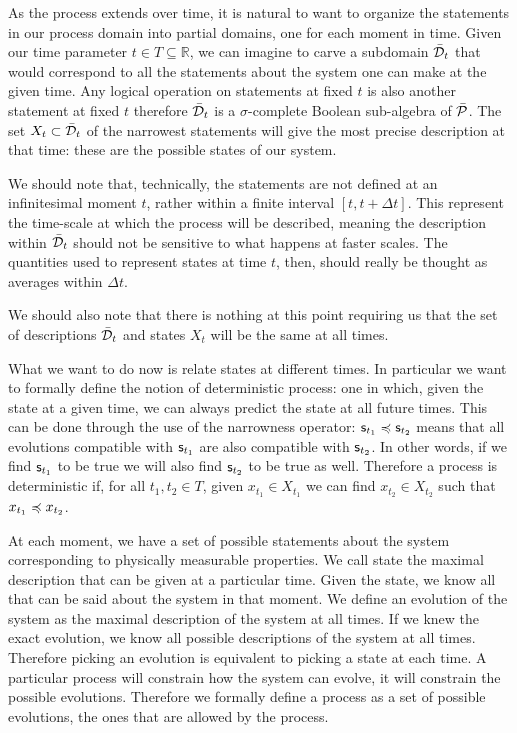 \documentclass[letterpaper]{article}
\begin{document}
As the process extends over time, it is natural to want to organize the statements in our process domain into partial domains, one for each moment in time. Given our time parameter $t \in T \subseteq \mathbb{R}$, we can imagine to carve a subdomain $\tdomain_t$ that would correspond to all the statements about the system one can make at the given time. Any logical operation on statements at fixed $t$ is also another statement at fixed $t$ therefore $\tdomain_t$ is a $\sigma$-complete Boolean sub-algebra of $\tdomain[P]$. The set $X_t \subset \tdomain_t$ of the narrowest statements will give the most precise description at that time: these are the possible states of our system.

We should note that, technically, the statements are not defined at an infinitesimal moment $t$, rather within a finite interval $[t, t + \Delta t]$. This represent the time-scale at which the process will be described, meaning the description within $\tdomain_t$ should not be sensitive to what happens at faster scales. The quantities used to represent states at time $t$, then, should really be thought as averages within $\Delta t$.

We should also note that there is nothing at this point requiring us that the set of descriptions $\tdomain_t$ and states $X_t$ will be the same at all times.

What we want to do now is relate states at different times. In particular we want to formally define the notion of deterministic process: one in which, given the state at a given time, we can always predict the state at all future times. This can be done through the use of the narrowness operator: $\stmt_{t_1} \narrower \stmt_{t_2}$ means that all evolutions compatible with $\stmt_{t_1}$ are also compatible with $\stmt_{t_2}$. In other words, if we find $\stmt_{t_1}$ to be true we will also find $\stmt_{t_2}$ to be true as well. Therefore a process is deterministic if, for all $t_1, t_2 \in T$, given $x_{t_1} \in X_{t_1}$ we can find $x_{t_2} \in X_{t_2}$ such that $x_{t_1} \narrower x_{t_2}$.



At each moment, we have a set of possible statements about the system corresponding to physically measurable properties. We call state the maximal description that can be given at a particular time. Given the state, we know all that can be said about the system in that moment. We define an evolution of the system as the maximal description of the system at all times. If we knew the exact evolution, we know all possible descriptions of the system at all times. Therefore picking an evolution is equivalent to picking a state at each time. A particular process will constrain how the system can evolve, it will constrain the possible evolutions. Therefore we formally define a process as a set of possible evolutions, the ones that are allowed by the process.
\end{document}
